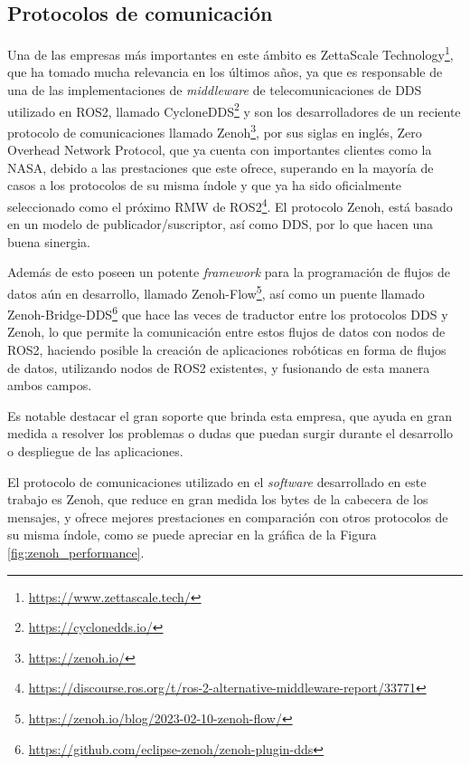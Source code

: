 \subsection{Protocolos de comunicación}
\label{sec:protocolos_comunicacion}

Una de las empresas más importantes en este ámbito es ZettaScale
Technology\footnote{\url{https://www.zettascale.tech/}}, que ha tomado mucha
relevancia en los últimos años, ya que es responsable de una de las
implementaciones de \textit{middleware} de telecomunicaciones de DDS utilizado
en ROS2, llamado CycloneDDS\footnote{\url{https://cyclonedds.io/}} y son los
desarrolladores de un reciente protocolo de comunicaciones llamado
Zenoh\footnote{\url{https://zenoh.io/}}, por sus siglas en inglés, Zero Overhead
Network Protocol, que ya cuenta con importantes clientes como la NASA, debido a
las prestaciones que este ofrece, superando en la mayoría de casos a los
protocolos de su misma índole y que ya ha sido oficialmente seleccionado como el
próximo RMW de
ROS2\footnote{\url{https://discourse.ros.org/t/ros-2-alternative-middleware-report/33771}}.
El protocolo Zenoh, está basado en un modelo de publicador/suscriptor, así como
DDS, por lo que hacen una buena sinergia.

Además de esto poseen un potente \textit{framework} para la programación de
flujos de datos aún en desarrollo, llamado
Zenoh-Flow\footnote{\url{https://zenoh.io/blog/2023-02-10-zenoh-flow/}}, así
como un puente llamado
Zenoh-Bridge-DDS\footnote{\url{https://github.com/eclipse-zenoh/zenoh-plugin-dds}}
que hace las veces de traductor entre los protocolos DDS y Zenoh, lo que permite
la comunicación entre estos flujos de datos con nodos de ROS2, haciendo posible
la creación de aplicaciones robóticas en forma de flujos de datos, utilizando
nodos de ROS2 existentes, y fusionando de esta manera ambos campos.

Es notable destacar el gran soporte que brinda esta empresa, que ayuda en gran
medida a resolver los problemas o dudas que puedan surgir durante el desarrollo o
despliegue de las aplicaciones.

El protocolo de comunicaciones utilizado en el \textit{software} desarrollado en
este trabajo es Zenoh, que reduce en gran medida los bytes de la cabecera de los
mensajes, y ofrece mejores prestaciones en comparación con otros protocolos de
su misma índole, como se puede apreciar en la gráfica de la Figura
\ref{fig:zenoh_performance}.

